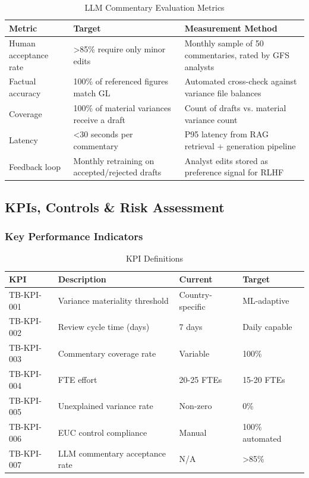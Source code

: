 \documentclass[11pt,a4paper]{article}
\begin{document}
\begin{table}[h]
\centering
\caption{LLM Commentary Evaluation Metrics}
\begin{tabular}{@{}L{3.5cm}L{4cm}L{6.5cm}@{}}
\toprule
\textbf{Metric} & \textbf{Target} & \textbf{Measurement Method} \\
\midrule
Human acceptance rate & >85\% require only minor edits & Monthly sample of 50 commentaries, rated by GFS analysts \\
Factual accuracy & 100\% of referenced figures match GL & Automated cross-check against variance file balances \\
Coverage & 100\% of material variances receive a draft & Count of drafts vs. material variance count \\
Latency & <30 seconds per commentary & P95 latency from RAG retrieval + generation pipeline \\
Feedback loop & Monthly retraining on accepted/rejected drafts & Analyst edits stored as preference signal for RLHF \\
\bottomrule
\end{tabular}
\end{table}

\subsection{KPIs, Controls \& Risk Assessment}

\subsubsection{Key Performance Indicators}

\begin{table}[h]
\centering
\caption{KPI Definitions}
\begin{tabular}{@{}L{2.5cm}L{4.5cm}L{3cm}L{3.5cm}@{}}
\toprule
\textbf{KPI} & \textbf{Description} & \textbf{Current} & \textbf{Target} \\
\midrule
TB-KPI-001 & Variance materiality threshold & Country-specific & ML-adaptive \\
TB-KPI-002 & Review cycle time (days) & 7 days & Daily capable \\
TB-KPI-003 & Commentary coverage rate & Variable & 100\% \\
TB-KPI-004 & FTE effort & 20-25 FTEs & 15-20 FTEs \\
TB-KPI-005 & Unexplained variance rate & Non-zero & 0\% \\
TB-KPI-006 & EUC control compliance & Manual & 100\% automated \\
TB-KPI-007 & LLM commentary acceptance rate & N/A & >85\% \\
\bottomrule
\end{tabular}
\end{table}
\end{document}
